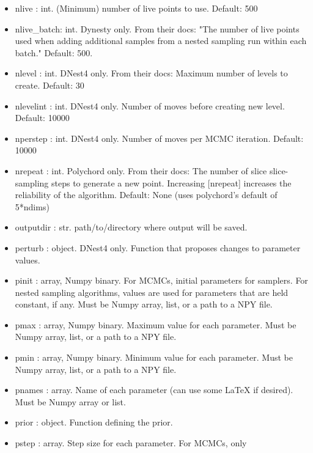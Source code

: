 \documentclass[letterpaper, 12pt]{article}
\begin{document}
\begin{itemize}
\item nlive : int. (Minimum) number of live points to use. Default: 500
\item nlive\_batch: int. Dynesty only. From their docs: "The number of  
                         live points used when adding additional  
                         samples from a nested sampling run within  
                         each batch."  Default: 500.
\item nlevel : int. DNest4 only. From their docs: Maximum number of levels to 
                    create.  Default: 30
\item nlevelint : int. DNest4 only. Number of moves before creating new level. 
                       Default: 10000
\item nperstep : int. DNest4 only. Number of moves per MCMC iteration.  
                      Default: 10000
\item nrepeat : int. Polychord only.  From their docs: The number of 
                     slice slice-sampling steps to generate a new 
                     point.  Increasing [nrepeat] increases the 
                     reliability of the algorithm.  Default: None 
                     (uses polychord's default of 5*ndims)
\item outputdir : str. path/to/directory where output will be saved.
\item perturb : object. DNest4 only. Function that proposes changes to 
                        parameter values.
\item pinit : array, Numpy binary. For MCMCs, initial parameters for  
                            samplers.  For nested sampling algorithms,  
                            values are used for parameters that are held  
                            constant, if any. 
                        Must be Numpy array, list, or a path to a NPY file.
\item pmax : array, Numpy binary. Maximum value for each parameter. 
                        Must be Numpy array, list, or a path to a NPY file.
\item pmin : array, Numpy binary. Minimum value for each parameter. 
                        Must be Numpy array, list, or a path to a NPY file.
\item pnames : array. Name of each parameter (can use some LaTeX if  
                          desired). 
                          Must be Numpy array or list.
\item prior : object. Function defining the prior.
\item pstep : array. Step size for each parameter.  For MCMCs, only  

\end{itemize}
\end{document}

